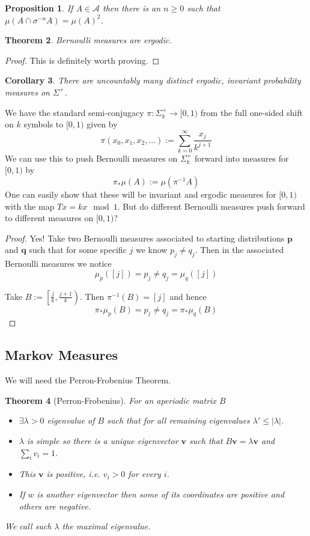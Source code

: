 \documentclass[11pt]{article}
\newcommand{\defeq}{:=}
\newcommand{\abs}[1]{\left|#1\right|}
\newcommand{\mv}[1]{\textbf{#1}}
\newcommand{\mdf}[1]{{\color{red} #1}}
\newtheorem{prop}{Proposition}[section]
\newtheorem{theorem}[prop]{Theorem}
\newtheorem{cor}[prop]{Corollary}
\begin{document}
\begin{prop}
If $A\in\mathcal{A}$ then there is an $n\geq 0$ such that $\mu(A\cap \sigma^{-n}A)=\mu(A)^2$.
\end{prop}

\begin{theorem}
Bernoulli measures are ergodic.
\end{theorem}

\begin{proof}
This is definitely worth proving.
\end{proof}

\begin{cor}
There are uncountably many distinct ergodic, invariant probability measures on $\Sigma^+$.
\end{cor}

We have the standard semi-conjugacy $\pi: \Sigma_k^+ \to [0, 1)$ from the full one-sided shift on $k$ symbols to $[0, 1)$ given by
\[
	\pi(x_0, x_1, x_2, \dots ) \defeq \sum_{k=0}^{\infty}\frac{x_j}{k^{j+1}}
\]
We can use this to push Bernoulli measures on $\Sigma_k^+$ forward into measures for $[0, 1)$ by
\[
	\pi_\ast \mu(A) \defeq \mu(\pi^{-1}A)
\]
One can easily show that these will be invariant and ergodic measures for $[0, 1)$ with the map $Tx = kx \mod 1$.
But do different Bernoulli measures push forward to different measures on $[0, 1)$?

\begin{proof}
Yes!
Take two Bernoulli measures associated to starting distributions $\mv{p}$ and $\mv{q}$ such that for some specific $j$ we know $p_j \neq q_j$.
Then in the associated Bernoulli measures we notice
\[
\mu_p(\left[ j\right]) = p_j \neq q_j = \mu_q(\left[ j\right])
\]

Take $B\defeq \left[ \frac{j}{k}, \frac{j+1}{k} \right)$.
Then $\pi^{-1}(B) = \left[ j\right]$ and hence
\[
	\pi_\ast \mu_p(B) = p_j \neq q_j = \pi_\ast \mu_q(B)
\]
\end{proof}

\subsection{Markov Measures}
We will need the Perron-Frobenius Theorem.

\begin{theorem}[Perron-Frobenius]
For an aperiodic matrix $B$
\begin{itemize}
	\item $\exists \lambda > 0$ eigenvalue of $B$ such that for all remaining eigenvalues $\lambda' \leq \abs{\lambda}$.
	\item $\lambda$ is simple so there is a unique eigenvector $\mv{v}$ such that $B\mv{v} = \lambda\mv{v}$ and $\sum_{i}v_i=1$.
	\item This $\mv{v}$ is positive, i.e. $v_i > 0$ for every $i$.
	\item If $w$ is another eigenvector then some of its coordinates are positive and others are negative.
\end{itemize}
We call such $\lambda$ the \mdf{maximal eigenvalue}.
\end{theorem}
\end{document}
